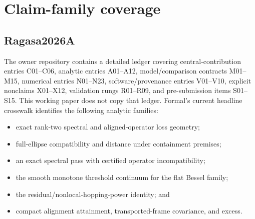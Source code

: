 \documentclass[11pt]{article}
\begin{document}
\section{Claim-family coverage}

\subsection{Ragasa2026A}

The owner repository contains a detailed ledger covering central-contribution entries
C01--C06, analytic entries A01--A12, model/comparison contracts M01--M15, numerical
entries N01--N23, software/provenance entries V01--V10, explicit nonclaims X01--X12,
validation rungs R01--R09, and pre-submission items S01--S15. This working paper does not
copy that ledger. Formal's current headline crosswalk identifies the following analytic
families:

\begin{itemize}
 \item exact rank-two spectral and aligned-operator loss geometry;
 \item full-ellipse compatibility and distance under containment premises;
 \item an exact spectral pass with certified operator incompatibility;
 \item the smooth monotone threshold continuum for the flat Bessel family;
 \item the residual/nonlocal-hopping-power identity; and
 \item compact alignment attainment, transported-frame covariance, and excess.
\end{itemize}
\end{document}
